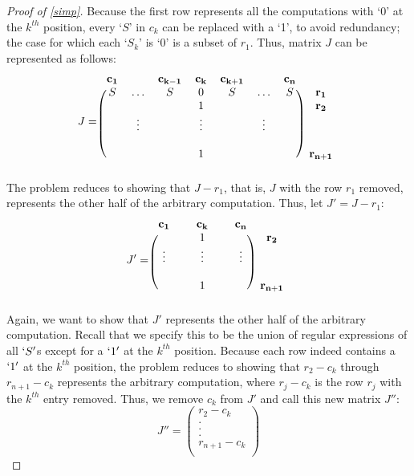 \documentclass[runningheads]{llncs}
\begin{document}
\begin{proof}[Proof of \ref{simp}]
Because the first row represents all the computations with `0' at the $k^{th}$ position, every `$S$' in $c_k$ can be replaced with a `1', to avoid redundancy; the case for which each `$S_k$' is `0' is a subset of $r_1$. Thus, matrix $J$ can be represented as follows:
\[
J = \begin{blockarray}{cccccccc}
\mathbf{c_1} & & \mathbf{c_{k-1}} & \mathbf{c_k} & \mathbf{c_{k+1}} & & \mathbf{c_n} \\
\begin{block}{(ccccccc)c}
    S & \hdots & S & 0 & S & \hdots & S & \mathbf{r_1}\\
     &  &  & 1 &  &  &  & \mathbf{r_2}\\
    &  \vdots &  & \vdots &  &  \vdots &  & \\
    &  &  &  &  & &  & \\
    & & & 1 & &  & & \mathbf{r_{n+1}}\\
\end{block}
\end{blockarray}
 \]
The problem reduces to showing that $J - r_1$, that is, $J$ with the row $r_1$ removed, represents the other half of the arbitrary computation. Thus, let $J' = J - r_1$:
\[
J' = \begin{blockarray}{cccccc}
\mathbf{c_1} &  & \mathbf{c_k} & & \mathbf{c_n} \\
\begin{block}{(ccccc)c}
     &   & 1 &   &  & \mathbf{r_2}\\
     \vdots & &  \vdots & & \vdots  & \\
    &   &   & &  & \\
    & & 1 &  & & \mathbf{r_{n+1}}\\
\end{block}
\end{blockarray}
 \]
Again, we want to show that $J'$ represents the other half of the arbitrary computation. Recall that we specify this to be the union of regular expressions of all $`S'$s except for a $`1'$ at the $k^{th}$ position. Because each row indeed contains a $`1'$ at the $k^{th}$ position, the problem reduces to showing that $r_2 - c_k$ through $r_{n+1} - c_k$ represents the arbitrary computation, where $r_j - c_k$ is the row $r_j$ with the $k^{th}$ entry removed. Thus, we remove $c_k$ from $J'$ and call this new matrix $J''$:
\[
 J'' = \begin{pmatrix}
    r_2 - c_k \\
    . \\
    . \\
    . \\
    r_{n+1} - c_k \\
    

\end{pmatrix}\]
\end{proof}
\end{document}

